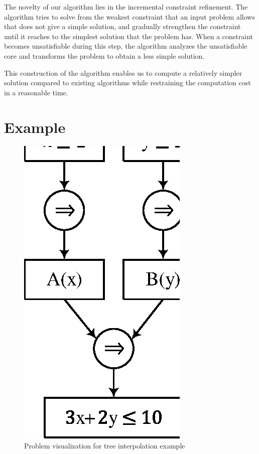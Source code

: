 The novelty of our algorithm lies in the incremental constraint
refinement.  The algorithm tries to solve from the weakest constraint
that an input problem allows that does not give a simple solution, and
gradually strengthen the constraint until it reaches to the simplest
solution that the problem has.  When a constraint becomes
unsatisfiable during this step, the algorithm analyzes the
unsatisfiable core and transforms the problem to obtain a less simple
solution.

This construction of the algorithm enables us to compute a relatively
simpler solution compared to existing algorithms while restraining the
computation cost in a reasonable time.

\section{Example}

\begin{figure}
\begin{center}
\includegraphics[scale=0.8]{figures/ex1.eps}
\end{center}
\vspace{-18pt}
\caption{Problem visualization for tree interpolation example}
\label{fig:ex1}
\end{figure}

